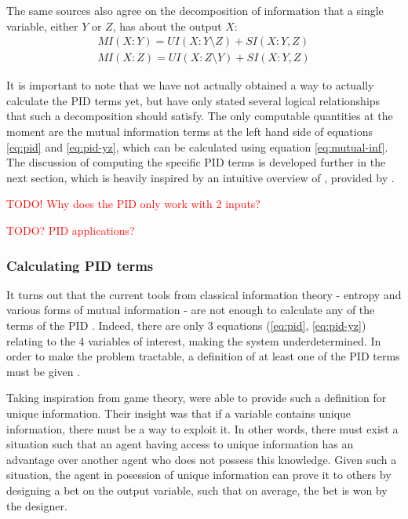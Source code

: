 \documentclass[12pt]{article}
\begin{document}
The same sources also agree on the decomposition of information that a single variable, either $Y$ or $Z$, has about the output $X$: 
\begin{equation}
\begin{split}
MI(X:Y) = UI(X:Y \setminus Z) + SI(X:Y,Z) \\
MI(X:Z) = UI(X:Z \setminus Y) + SI(X:Y,Z)
\label{eq:pid-yz}
\end{split}
\end{equation}

It is important to note that we have not actually obtained a way to actually calculate the PID terms yet, but have only stated several logical relationships that such a decomposition should satisfy. The only computable quantities at the moment are the mutual information terms at the left hand side of equations \ref{eq:pid} and \ref{eq:pid-yz}, which can be calculated using equation \ref{eq:mutual-inf}. The discussion of computing the specific PID terms is developed further in the next section, which is heavily inspired by an intuitive overview of \cite{bertschinger}, provided by \cite{pid-goal-functions}. 

\textcolor{red}{TODO! Why does the PID only work with 2 inputs?}

\textcolor{red}{TODO? PID applications?}

\subsubsection{Calculating PID terms}

It turns out that the current tools from classical information theory - entropy and various forms of mutual information - are not enough to calculate any of the terms of the PID \cite{williams-beer}. Indeed, there are only 3 equations (\ref{eq:pid}, \ref{eq:pid-yz}) relating to the 4 variables of interest, making the system underdetermined. In order to make the problem tractable, a definition of at least one of the PID terms must be given \cite{bertschinger}.

Taking inspiration from game theory, \cite{bertschinger} were able to provide such a definition for unique information. Their insight was that if a variable contains unique information, there must be a way to exploit it. In other words, there must exist a situation such that an agent having access to unique information has an advantage over another agent who does not possess this knowledge. Given such a situation, the agent in posession of unique information can prove it to others by designing a bet on the output variable, such that on average, the bet is won by the designer.
\end{document}
